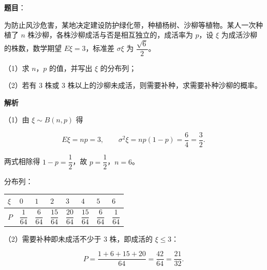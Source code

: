 \begin{answer}

\textbf{题目}：

为防止风沙危害，某地决定建设防护绿化带，种植杨树、沙柳等植物。某人一次种植了 $n$ 株沙柳，各株沙柳成活与否是相互独立的，成活率为 $p$，设 $\xi$ 为成活沙柳的株数，数学期望 $E\xi=3$，标准差 $\sigma\xi$ 为 $\dfrac{\sqrt6}{2}$。

（1）求 $n$，$p$ 的值，并写出 $\xi$ 的分布列；

（2）若有 $3$ 株或 $3$ 株以上的沙柳未成活，则需要补种，求需要补种沙柳的概率。

\textbf{解析}

（1）由 $\xi\sim B(n,p)$ 得

\nopagebreak[4]
\[E\xi=np=3,\qquad \sigma^2\xi=np(1-p)=\frac64=\frac32.\]

两式相除得 $1-p=\dfrac12$，故 $p=\dfrac12$，$n=6$。

分布列：

\begin{center}
\begingroup\setlength{\tabcolsep}{4pt}
\begin{tabular}{llllllll}
\toprule
$\xi$ & $0$ & $1$ & $2$ & $3$ & $4$ & $5$ & $6$ \\
\midrule
$P$ & $\dfrac1{64}$ & $\dfrac6{64}$ & $\dfrac{15}{64}$ & $\dfrac{20}{64}$ & $\dfrac{15}{64}$ & $\dfrac6{64}$ & $\dfrac1{64}$ \\
\bottomrule
\end{tabular}
\endgroup
\end{center}

（2）需要补种即未成活不少于 $3$ 株，即成活的 $\xi\leqslant3$：

\nopagebreak[4]
\[P=\frac{1+6+15+20}{64}=\frac{42}{64}=\frac{21}{32}.\]


\end{answer}

